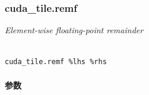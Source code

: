 \documentclass{article}
\begin{document}
\subsubsection{cuda\_tile.remf}


\textit{Element-wise floating-point remainder}




\begin{lstlisting}

cuda_tile.remf %lhs %rhs

\end{lstlisting}



\paragraph{参数}
\end{document}
